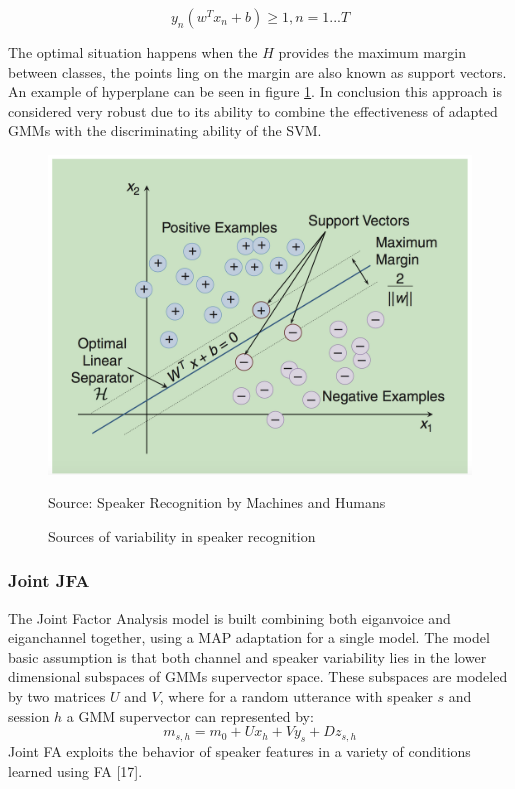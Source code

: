 \begin{equation}
    y_{n}(w^Tx_{n}+b) \geq 1,n = 1...T
\end{equation}

The optimal situation happens when the  $H$ provides the maximum
margin between classes, the points ling on the margin are also known as support vectors.
An example of hyperplane can be seen in figure \ref{fig:gmmsvm}.
In conclusion this approach is considered very robust due to its ability
to combine the effectiveness of adapted GMMs with the discriminating ability of the SVM.
\begin{figure}[h]
\caption{Sources of variability in speaker recognition}
\label{fig:gmmsvm}
\centering
\includegraphics[scale=0.20]{gmmsvm.png}
\par{Source: Speaker Recognition by Machines and Humans}

\end{figure}



\subsubsection{Joint JFA}
The Joint Factor Analysis model is built combining both
eiganvoice and eiganchannel together, using a MAP adaptation
for a single model. The model basic assumption is that both
channel and speaker variability lies in the  lower dimensional
subspaces of GMMs supervector space. These subspaces are
modeled by two matrices $U$ and $V$, where for a random
utterance with speaker $s$ and session $h$ a GMM supervector
can represented by:
\begin{equation}
    m_{s,h} = m_{0} + Ux_{h} + Vy_{s} + Dz_{s,h}
\end{equation}
Joint FA exploits the behavior of speaker features in a variety of
conditions learned using FA [17].


